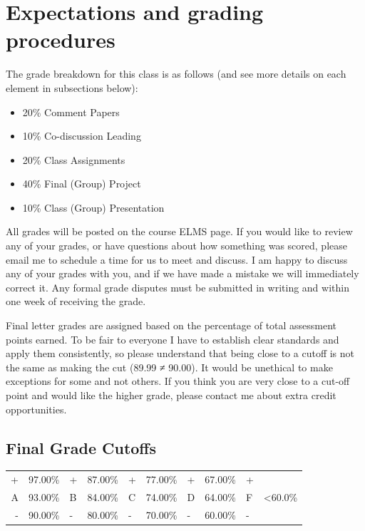 \documentclass[
]{book}
\providecommand{\tightlist}{%
  \setlength{\itemsep}{0pt}\setlength{\parskip}{0pt}}
\begin{document}
\hypertarget{expectations-and-grading-procedures}{%
\section{Expectations and grading procedures}\label{expectations-and-grading-procedures}}

The grade breakdown for this class is as follows (and see more details on each element in subsections below):

\begin{itemize}
\tightlist
\item
  20\% Comment Papers
\item
  10\% Co-discussion Leading
\item
  20\% Class Assignments
\item
  40\% Final (Group) Project
\item
  10\% Class (Group) Presentation
\end{itemize}

All grades will be posted on the course ELMS page. If you would like to review any of your grades, or have questions about how something was scored, please email me to schedule a time for us to meet and discuss. I am happy to discuss any of your grades with you, and if we have made a mistake we will immediately correct it. Any formal grade disputes must be submitted in writing and within one week of receiving the grade.

Final letter grades are assigned based on the percentage of total assessment points earned. To be fair to everyone I have to establish clear standards and apply them consistently, so please understand that being close to a cutoff is not the same as making the cut (89.99 ≠ 90.00). It would be unethical to make exceptions for some and not others. If you think you are very close to a cut-off point and would like the higher grade, please contact me about extra credit opportunities.

\hypertarget{final-grade-cutoffs}{%
\subsection{Final Grade Cutoffs}\label{final-grade-cutoffs}}

\begin{longtable}[]{@{}rlllllllll@{}}
\toprule
\endhead
+ & 97.00\% & + & 87.00\% & + & 77.00\% & + & 67.00\% & + &\tabularnewline
A & 93.00\% & B & 84.00\% & C & 74.00\% & D & 64.00\% & F & \textless60.0\%\tabularnewline
- & 90.00\% & - & 80.00\% & - & 70.00\% & - & 60.00\% & - &\tabularnewline
\bottomrule
\end{longtable}
\end{document}
